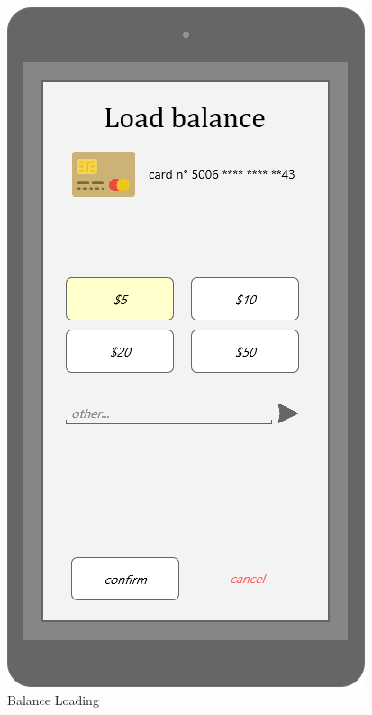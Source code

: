 \documentclass{article}
\begin{document}
\begin{figure}[H]
\centering
{}
  \includegraphics[width=\linewidth]{07-Credit_card_balance_loading.png}
  \caption{Balance Loading}\label{fig:MU16}
\endminipage\hfill
\end{figure}
\newpage
\end{document}
